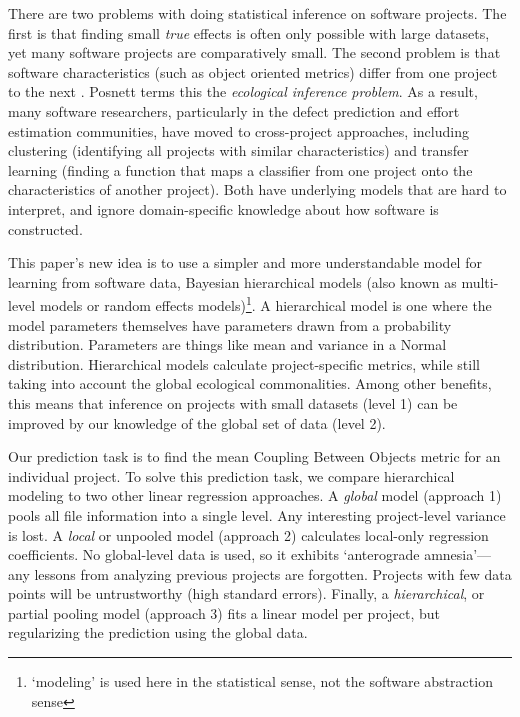 \documentclass[sigconf,natbib=false]{acmart}
\begin{document}
There are two problems with doing statistical inference on software projects. The first is that finding small \emph{true} effects is often only possible with large datasets, yet many software projects are comparatively small. The second problem is that software characteristics (such as object oriented metrics) differ from one project to the next \cite{zhang13context}. Posnett \cite{Posnett:2011} terms this the \emph{ecological inference problem}. As a result, many software researchers, particularly in the defect prediction and effort estimation communities, have moved to cross-project approaches, including clustering (identifying all projects with similar characteristics) and transfer learning (finding a function that maps a classifier from one project onto the characteristics of another project). Both have underlying models that are hard to interpret, and ignore domain-specific knowledge about how software is constructed. %

This paper's new idea is to use a simpler and more understandable model for learning from software data, Bayesian hierarchical models (also known as multi-level models or random effects models)\footnote{`modeling' is used here in the statistical sense, not the software abstraction sense}. A hierarchical model is one where the model parameters themselves have parameters drawn from a probability distribution. Parameters are things like mean and variance in a Normal distribution. Hierarchical models calculate project-specific metrics, while still taking into account the global ecological commonalities. Among other benefits, this means that inference on projects with small datasets (level 1) can be improved by our knowledge of the global set of data (level 2). %

Our prediction task is to find the mean Coupling Between Objects metric for an individual project. To solve this prediction task, we compare hierarchical modeling to two other linear regression approaches. A \emph{global} model (approach 1) pools all file information into a single level. Any interesting project-level variance is lost. A \emph{local} or unpooled model (approach 2) calculates local-only regression coefficients. No global-level data is used, so it exhibits `anterograde amnesia'---any lessons from analyzing previous projects are forgotten. Projects with few data points will be untrustworthy (high standard errors). Finally, a \emph{hierarchical}, or partial pooling model (approach 3) fits a linear model per project, but regularizing the prediction using the global data. 
\end{document}

